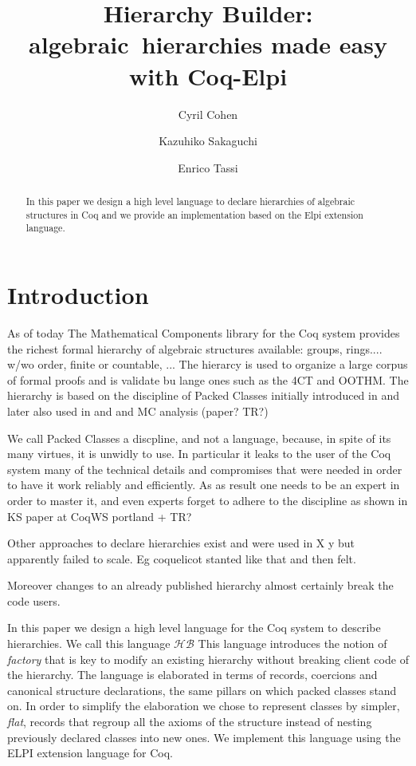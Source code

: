 \documentclass[a4paper,UKenglish,cleveref, autoref]{lipics-v2019}
\title{Hierarchy Builder: algebraic~hierarchies made easy with Coq-Elpi} %
\author{Cyril Cohen}{Inria, France}{Cyril.Cohen@inria.fr}{}{}
\author{Kazuhiko Sakaguchi}{University of Tsukuba, Japan}{sakaguchi@coins.tsukuba.ac.jp}{}{}
\author{Enrico Tassi}{Inria, France}{Enrico.Tassi@inria.fr}{}{}
\newcommand{\HB}{\ensuremath{\mathcal{HB}}}
\begin{document}
\maketitle

\begin{abstract}
In this paper we design a high level language
to declare hierarchies of algebraic structures in Coq and
we provide an implementation based on the Elpi extension language.
\end{abstract}

\section{Introduction}
As of today The Mathematical Components library for the Coq system
provides the richest formal hierarchy of algebraic structures available:
groups, rings.... w/wo order, finite or countable, ...
The hierarcy is used to organize a large corpus of formal proofs and
is validate bu lange ones such as the 4CT and OOTHM.
The hierarchy is based on the discipline of Packed Classes initially introduced
in \cite{DBLP:conf/itp/GonthierAABCGRMOBPRSTT13} and later also used in
\cite{DBLP:conf/mpc/AffeldtNS19} and \cite{DBLP:journals/mics/BoldoLM15}
and MC analysis (paper? TR?)

We call Packed Classes a discpline, and not a language, because, in spite of
its many virtues, it is unwidly to use. In particular it leaks to the user
of the Coq system many of the technical details and compromises that were
needed in order to have it work reliably and efficiently. As as result one
needs to be an expert in order to master it, and even experts forget
to adhere to the discipline as shown in KS paper at CoqWS portland + TR?

Other approaches to declare hierarchies exist and were used in X y but
apparently failed to scale. Eg coquelicot stanted like that and then felt.

Moreover changes to an
already published hierarchy almost certainly break the code users.

In this paper we design a high level language for the Coq system to describe
hierarchies. We call this language \HB{}
This language introduces the notion of \emph{factory} that is key
to modify an existing hierarchy without breaking client code of the hierarchy.
The language is elaborated in terms of records, coercions and canonical
structure declarations, the same pillars on which packed classes stand on.
In order to simplify the elaboration
we chose to represent classes by simpler,
 \emph{flat}, records that regroup all the
axioms of the structure instead of nesting previously declared classes
into new ones.
We implement this language using the ELPI extension language for Coq.
\end{document}
